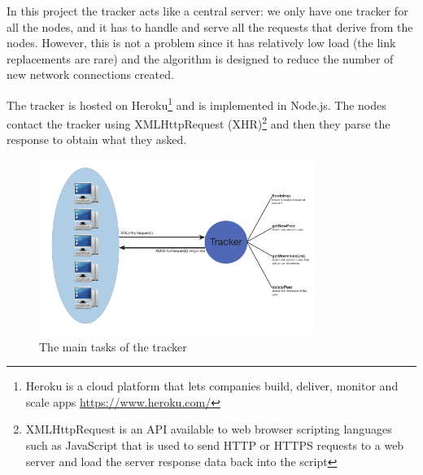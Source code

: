 In this project the tracker acts like a central server: we only have one tracker for all the nodes, and it has to handle and serve all the requests that derive from the nodes. However, this is not a problem since it has relatively low load (the link replacements are rare) and the algorithm is designed to reduce the number of new network connections created. 

The tracker is hosted on Heroku\footnote{Heroku is a cloud platform that lets companies build, deliver, monitor and scale apps \url{https://www.heroku.com/}} and is implemented in Node.js. The nodes contact the tracker using \textsf{XMLHttpRequest} (XHR)\footnote{XMLHttpRequest is an API available to web browser scripting languages such as JavaScript that is used to send HTTP or HTTPS requests to a web server and load the server response data back into the script} and then they parse the response to obtain what they asked.

\begin{figure}[ht]
  \centering
  \includegraphics[keepaspectratio=true, width=0.8\textwidth]{images/tracker}\caption{The main tasks of the tracker}
  \label{fig:tracker}
\end{figure}

